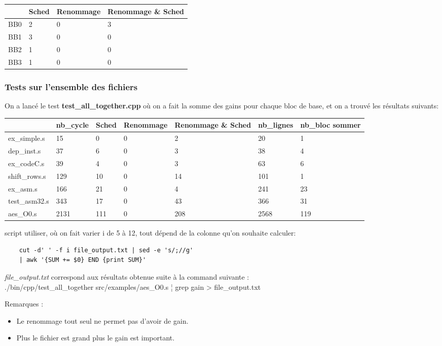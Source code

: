 \documentclass[11pt, openany]{article}
\begin{document}
\begin{tabular}{|p{3.5cm}||p{3.5cm}|p{3.5cm}|p{3.5cm}|}
 \hline
  & Sched & Renommage & Renommage \& Sched\\
 \hline
  BB0 & 2 & 0 & 3 \\
  BB1 & 3 & 0 & 0 \\
  BB2 & 1 & 0 & 0 \\
  BB3 & 1 & 0 & 0 \\
 \hline
\end{tabular}


\subsubsection{Tests sur l'ensemble des fichiers}
On a lancé le test \textbf{test\_all\_together.cpp} où on a fait la somme des gains pour chaque bloc de base, et on a trouvé les résultats suivants:

\begin{tabular}{ |p{2.5cm}||p{2cm}|p{2.5cm}|p{2.5cm}|p{2.5cm}|p{2cm}|p{2cm}| }
 \hline
   & nb_cycle & Sched & Renommage & Renommage \& Sched & nb\_lignes  & nb\_bloc sommer\\
 \hline
  ex\_simple.s & 15 & 0 & 0  & 2 & 20 & 1 \\
  dep\_inst.s & 37 & 6 & 0  & 3 & 38 & 4\\
  ex\_codeC.s  & 39 & 4 & 0 & 3 & 63 & 6 \\
  shift\_rows.s  & 129 & 10 & 0 & 14 & 101 & 1\\
  ex\_asm.s	& 166 & 21 & 0 & 4  & 241 & 23 \\
  test\_asm32.s  & 343 & 17 & 0 & 43 & 366 & 31\\
  aes\_O0.s  & 2131 & 111 & 0 & 208  & 2568 & 119 \\
 \hline
\end{tabular}

script utiliser, où on fait varier i de 5 à 12, tout dépend de la colonne qu'on souhaite calculer:
\begin{lstlisting}
    cut -d' ' -f i file_output.txt | sed -e 's/;//g' 
    | awk '{SUM += $0} END {print SUM}'
\end{lstlisting}

\textit{file\_output.txt} correspond aux résultats obtenue suite à la command suivante : \\
./bin/cpp/test\_all\_together src/examples/aes\_O0.s ¦ grep gain > file\_output.txt

Remarques :
\begin{itemize}
    \item Le renommage tout seul ne permet pas d'avoir de gain.
    \item Plus le fichier est grand plus le gain est important.
\end{itemize}
\end{document}
